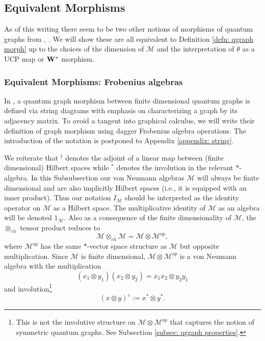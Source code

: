 \documentclass[12pt]{article}
\theoremstyle{definition}
\newcommand{\mc}[1]{\mathcal{#1}}
\newcommand{\<}{\langle}
\renewcommand{\>}{\rangle}
\newcommand{\eh}{\otimes_{eh}}
\begin{document}
\subsection{Equivalent Morphisms} \label{subsec: equiv-morphs}

As of this writing there seem to be two other notions of morphisms of quantum graphs from \cite{musto-reutter-verdon},  \cite{weavergraphsrelations}. We will show these are all equivalent to Definition \ref{defn: qgraph morph} up to the choices of the dimension of $\mc M$ and the interpretation of $\theta$ as a UCP map or ${\bf W^*}$ morphism.

\subsubsection{Equivalent Morphisms: Frobenius algebras} \label{subsubsec: frob-morphism}

In \cite{musto-reutter-verdon}, a quantum graph morphism between finite dimensional quantum graphs is defined via string diagrams with emphasis on characterizing a graph by its adjacency matrix. To avoid a tangent into graphical calculus, we will write their definition of graph morphism using dagger Frobenius algebra operations. The introduction of the notation is postponed to Appendix \ref{appendix: string}.

We reiterate that $^\dagger$ denotes the adjoint of a linear map between (finite dimensional) Hilbert spaces while $^*$ denotes the involution in the relevant $*$-algebra. In this Subsubsection our von Neumann algebras $\mc M$ will always be finite dimensional and are also implicitly Hilbert spaces (i.e., it is equipped with an inner product). Thus our notation $I_{\mc M}$ should be interpreted as the identity operator on $\mc M$ as a Hilbert space. The multiplicative identity of $\mc M$ as an algebra will be denoted $1_{\mc M}$. Also as a consequence of the finite dimensionality of $\mc M$, the $\eh$ tensor product reduces to 
\[
\mc M \eh \mc M = \mc M \otimes \mc M^{op},
\]
where $\mc M^{op}$ has the same $*$-vector space structure as $\mc M$ but opposite multiplication. Since $\mc M$ is finite dimensional, $\mc M \otimes \mc M^{op}$ is a von Neumann algebra with the multiplication
\[
(x_1 \otimes y_1) (x_2 \otimes y_2)  = x_1 x_2 \otimes y_2 y_1
\]
and involution\footnote{This is not the involutive structure on $\mc M \otimes \mc M^{op}$ that captures the notion of symmetric quantum graphs. See Subsection \ref{subsec: qgraph properties}.}
\[
(x \otimes y)^\diamond := x^* \otimes y^*.
\]
\end{document}
